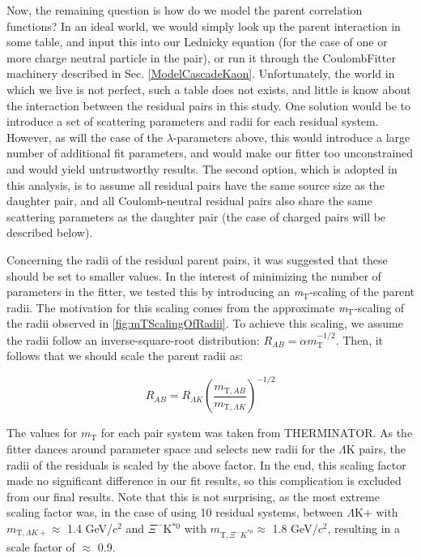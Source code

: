 \documentclass[../AnalysisNoteJBuxton.tex]{subfiles}
\begin{document}
Now, the remaining question is how do we model the parent correlation functions?  In an ideal world, we would simply look up the parent interaction in some table, and input this into our Lednicky equation (for the case of one or more charge neutral particle in the pair), or run it through the CoulombFitter machinery described in Sec. \ref{ModelCascadeKaon}.  Unfortunately, the world in which we live is not perfect, such a table does not exists, and little is know about the interaction between the residual pairs in this study.  One solution would be to introduce a set of scattering parameters and radii for each residual system.  However, as will the case of the $\lambda$-parameters above, this would introduce a large number of additional fit parameters, and would make our fitter too unconstrained and would yield untrustworthy results.  The second option, which is adopted in this analysis, is to assume all residual pairs have the same source size as the daughter pair, and all Coulomb-neutral residual pairs also share the same scattering parameters as the daughter pair (the case of charged pairs will be described below).

Concerning the radii of the residual parent pairs, it was suggested that these should be set to smaller values.  In the interest of minimizing the number of parameters in the fitter, we tested this by introducing an \textit{m}$_{\mathrm{T}}$-scaling of the parent radii.  The motivation for this scaling comes from the approximate \textit{m}$_{\mathrm{T}}$-scaling of the radii observed in \ref{fig:mTScalingOfRadii}.  To achieve this scaling, we assume the radii follow an inverse-square-root distribution: $R_{AB} = \alpha m_{\mathrm{T}}^{-1/2}$.  Then, it follows that we should scale the parent radii as:

\begin{equation}
R_{AB} = R_{\Lambda K}\left(\frac{m_{\mathrm{T},AB}}{m_{\mathrm{T},\Lambda K}}\right)^{-1/2}
\end{equation}

The values for $m_{\mathrm{T}}$ for each pair system was taken from THERMINATOR.  As the fitter dances around parameter space and selects new radii for the $\Lambda$K pairs, the radii of the residuals is scaled by the above factor.  In the end, this scaling factor made no significant difference in our fit results, so this complication is excluded from our final results.  Note that this is not surprising, as the most extreme scaling factor was, in the case of using 10 residual systems, between $\Lambda$K+ with $m_{\mathrm{T},\Lambda K+} \approx$ 1.4 GeV/$c^{2}$ and $\Xi^{-}$K$^{*0}$ with $m_{\mathrm{T},\Xi^{-} K^{*0}} \approx$ 1.8 GeV/$c^{2}$, resulting in a scale factor of $\approx$ 0.9.
\end{document}
